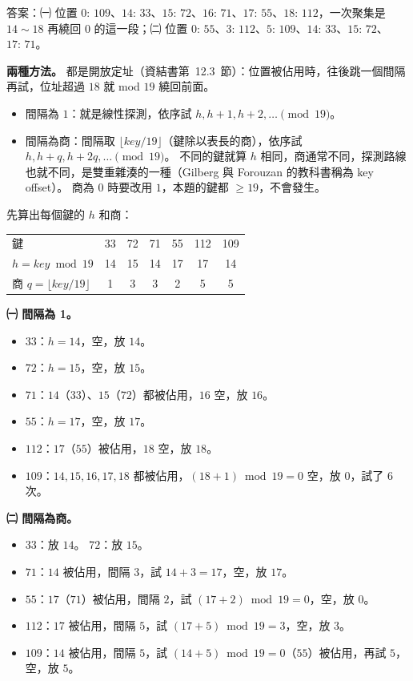 \begin{pastsoln}
答案：㈠ 位置 $0{:}\,109$、$14{:}\,33$、$15{:}\,72$、$16{:}\,71$、$17{:}\,55$、$18{:}\,112$，一次聚集是 $14 \sim 18$
再繞回 $0$ 的這一段；㈡ 位置 $0{:}\,55$、$3{:}\,112$、$5{:}\,109$、$14{:}\,33$、$15{:}\,72$、$17{:}\,71$。

\textbf{兩種方法。} 都是開放定址（資結書第~12.3~節）：位置被佔用時，往後跳一個間隔再試，位址超過 $18$ 就
mod $19$ 繞回前面。
\begin{itemize}
\item 間隔為 $1$：就是線性探測，依序試 $h, h + 1, h + 2, \ldots \pmod{19}$。
\item 間隔為商：間隔取 $\lfloor \mathit{key} / 19 \rfloor$（鍵除以表長的商），依序試 $h, h + q, h + 2q, \ldots \pmod{19}$。
不同的鍵就算 $h$ 相同，商通常不同，探測路線也就不同，是雙重雜湊的一種（Gilberg 與 Forouzan 的教科書稱為
key offset）。 商為 $0$ 時要改用 $1$，本題的鍵都 $\ge 19$，不會發生。
\end{itemize}
先算出每個鍵的 $h$ 和商：
\begin{center}
\begin{tabular}{lcccccc}
\toprule
鍵 & 33 & 72 & 71 & 55 & 112 & 109 \\
$h = \mathit{key} \bmod 19$ & 14 & 15 & 14 & 17 & 17 & 14 \\
商 $q = \lfloor \mathit{key}/19 \rfloor$ & 1 & 3 & 3 & 2 & 5 & 5 \\
\bottomrule
\end{tabular}
\end{center}

\textbf{㈠ 間隔為 1。}
\begin{itemize}
\item $33$：$h = 14$，空，放 $14$。
\item $72$：$h = 15$，空，放 $15$。
\item $71$：$14$（$33$）、$15$（$72$）都被佔用，$16$ 空，放 $16$。
\item $55$：$h = 17$，空，放 $17$。
\item $112$：$17$（$55$）被佔用，$18$ 空，放 $18$。
\item $109$：$14, 15, 16, 17, 18$ 都被佔用，$(18 + 1) \bmod 19 = 0$ 空，放 $0$，試了 $6$ 次。
\end{itemize}

\textbf{㈡ 間隔為商。}
\begin{itemize}
\item $33$：放 $14$。 $72$：放 $15$。
\item $71$：$14$ 被佔用，間隔 $3$，試 $14 + 3 = 17$，空，放 $17$。
\item $55$：$17$（$71$）被佔用，間隔 $2$，試 $(17 + 2) \bmod 19 = 0$，空，放 $0$。
\item $112$：$17$ 被佔用，間隔 $5$，試 $(17 + 5) \bmod 19 = 3$，空，放 $3$。
\item $109$：$14$ 被佔用，間隔 $5$，試 $(14 + 5) \bmod 19 = 0$（$55$）被佔用，再試 $5$，空，放 $5$。
\end{itemize}


\end{pastsoln}

